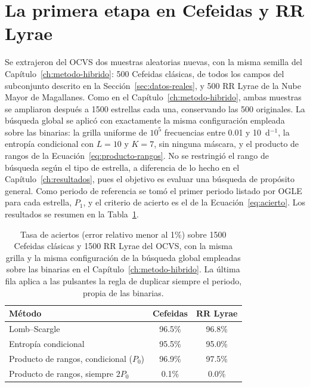 \documentclass[12pt,letterpaper,oneside]{book}
\begin{document}
\section{La primera etapa en Cefeidas y RR Lyrae}
\label{sec:unificado-pulsantes}

Se extrajeron del OCVS dos muestras aleatorias nuevas, con la misma semilla del Cap\'itulo~\ref{ch:metodo-hibrido}: 500 Cefeidas cl\'asicas, de todos los campos del subconjunto descrito en la Secci\'on~\ref{sec:datos-reales}, y 500 RR Lyrae de la Nube Mayor de Magallanes. Como en el Cap\'itulo~\ref{ch:metodo-hibrido}, ambas muestras se ampliaron despu\'es a 1500 estrellas cada una, conservando las 500 originales. La b\'usqueda global se aplic\'o con exactamente la misma configuraci\'on empleada sobre las binarias: la grilla uniforme de $10^5$ frecuencias entre 0.01 y 10~d$^{-1}$, la entrop\'ia condicional con $L=10$ y $K=7$, sin ninguna m\'ascara, y el producto de rangos de la Ecuaci\'on~\eqref{eq:producto-rangos}. No se restringi\'o el rango de b\'usqueda seg\'un el tipo de estrella, a diferencia de lo hecho en el Cap\'itulo~\ref{ch:resultados}, pues el objetivo es evaluar una b\'usqueda de prop\'osito general. Como periodo de referencia se tom\'o el primer periodo listado por OGLE para cada estrella, $P_1$, y el criterio de acierto es el de la Ecuaci\'on~\eqref{eq:acierto}. Los resultados se resumen en la Tabla~\ref{tab:unificado-pulsantes}.

\begin{table}[H]
	\centering
	\small
	\begin{tabular}{lcc}
		\hline
		\textbf{M\'etodo} & \textbf{Cefeidas} & \textbf{RR Lyrae} \\
		\hline
		Lomb--Scargle & 96.5\% & 96.8\% \\
		Entrop\'ia condicional & 95.5\% & 95.0\% \\
		Producto de rangos, condicional ($P_0$) & 96.9\% & 97.5\% \\
		Producto de rangos, siempre $2P_0$ & 0.1\% & 0.0\% \\
		\hline
	\end{tabular}
	\caption[Aciertos de la primera etapa sobre Cefeidas y RR Lyrae]{Tasa de aciertos (error relativo menor al 1\%) sobre 1500 Cefeidas cl\'asicas y 1500 RR Lyrae del OCVS, con la misma grilla y la misma configuraci\'on de la b\'usqueda global empleadas sobre las binarias en el Cap\'itulo~\ref{ch:metodo-hibrido}. La \'ultima fila aplica a las pulsantes la regla de duplicar siempre el periodo, propia de las binarias.}
	\label{tab:unificado-pulsantes}
\end{table}
\end{document}
